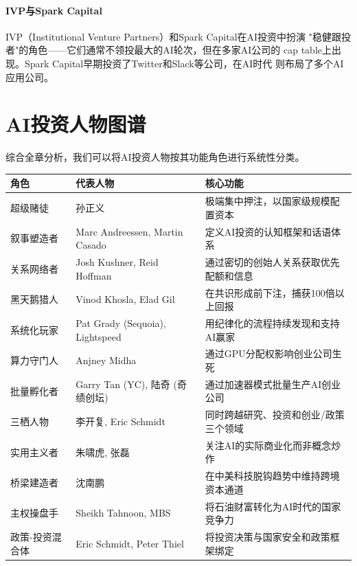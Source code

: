 \paragraph{IVP与Spark Capital}
IVP（Institutional Venture Partners）和Spark Capital在AI投资中扮演
"稳健跟投者"的角色——它们通常不领投最大的AI轮次，但在多家AI公司的
cap table上出现。Spark Capital早期投资了Twitter和Slack等公司，在AI时代
则布局了多个AI应用公司。


\section{AI投资人物图谱}
\label{sec:inv-landscape}

综合全章分析，我们可以将AI投资人物按其功能角色进行系统性分类。

\begin{keybox}[AI投资人物功能分类（2024--2026）]
\small
\begin{tabularx}{\textwidth}{l l X}
\toprule
\rowcolor{figLightGray}
\textbf{角色} & \textbf{代表人物} & \textbf{核心功能} \\
\midrule
超级赌徒     & 孙正义 &
  极端集中押注，以国家级规模配置资本 \\
叙事塑造者   & Marc Andreessen, Martin Casado &
  定义AI投资的认知框架和话语体系 \\
关系网络者   & Josh Kushner, Reid Hoffman &
  通过密切的创始人关系获取优先配额和信息 \\
黑天鹅猎人   & Vinod Khosla, Elad Gil &
  在共识形成前下注，捕获100倍以上回报 \\
系统化玩家   & Pat Grady (Sequoia), Lightspeed &
  用纪律化的流程持续发现和支持AI赢家 \\
算力守门人   & Anjney Midha &
  通过GPU分配权影响创业公司生死 \\
批量孵化者   & Garry Tan (YC), 陆奇 (奇绩创坛) &
  通过加速器模式批量生产AI创业公司 \\
三栖人物     & 李开复, Eric Schmidt &
  同时跨越研究、投资和创业/政策三个领域 \\
实用主义者   & 朱啸虎, 张磊 &
  关注AI的实际商业化而非概念炒作 \\
桥梁建造者   & 沈南鹏 &
  在中美科技脱钩趋势中维持跨境资本通道 \\
主权操盘手   & Sheikh Tahnoon, MBS &
  将石油财富转化为AI时代的国家竞争力 \\
政策-投资混合体 & Eric Schmidt, Peter Thiel &
  将投资决策与国家安全和政策框架绑定 \\
\bottomrule
\end{tabularx}
\end{keybox}


